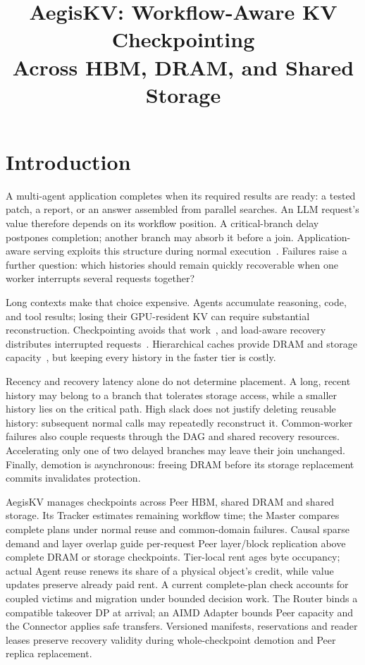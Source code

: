 \documentclass[sigplan,10pt,anonymous,nonacm]{acmart}
\title{AegisKV: Workflow-Aware KV Checkpointing\texorpdfstring{\\}{ }Across HBM, DRAM, and Shared Storage}
\begin{document}
\pagestyle{aegispreview}

\maketitle
\thispagestyle{aegispreview}
\raggedbottom

\section{Introduction}
\label{sec:introduction}

A multi-agent application completes when its required results are ready:
a tested patch, a report, or an answer assembled from parallel searches.
An LLM request's value therefore depends on its workflow position. A
critical-branch delay postpones completion; another branch may absorb it
before a join. Application-aware serving exploits this structure during
normal execution~\cite{lin2024parrot,pan2025kvflow,ni2026topas}. Failures
raise a further question: which histories should remain quickly
recoverable when one worker interrupts several requests together?

Long contexts make that choice expensive. Agents accumulate reasoning,
code, and tool results; losing their GPU-resident KV can require substantial
reconstruction. Checkpointing avoids that work~\cite{strati2024dejavu,jayakody2026ghostserve},
and load-aware recovery distributes interrupted requests~\cite{cao2026lumen}.
Hierarchical caches provide DRAM and storage capacity~\cite{qin2025mooncake,xie2026strata},
but keeping every history in the faster tier is costly.

Recency and recovery latency alone do not determine placement. A long,
recent history may belong to a branch that tolerates storage access,
while a smaller history lies on the critical path. High slack does not
justify deleting reusable history: subsequent normal calls may repeatedly
reconstruct it. Common-worker failures also couple requests through the
DAG and shared recovery resources. Accelerating only one of two delayed
branches may leave their join unchanged. Finally, demotion is asynchronous:
freeing DRAM before its storage replacement commits invalidates protection.

AegisKV manages checkpoints across Peer HBM, shared DRAM and shared storage.
Its Tracker estimates remaining workflow time; the Master compares
complete plans under normal reuse and common-domain failures. Causal
sparse demand and layer overlap guide per-request Peer layer/block
replication above complete DRAM or storage checkpoints. Tier-local rent
ages byte occupancy; actual Agent reuse renews its share of a physical
object's credit, while value updates preserve already paid rent. A
current complete-plan check accounts for coupled victims and migration
under bounded decision work. The Router binds a compatible takeover
DP at arrival; an AIMD Adapter bounds Peer capacity and the Connector applies
safe transfers. Versioned manifests, reservations and reader leases
preserve recovery validity during whole-checkpoint demotion and Peer
replica replacement.
\end{document}
